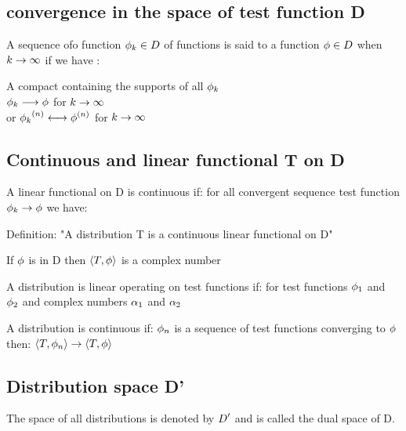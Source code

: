 \documentclass[11pt, openright]{book}
\begin{document}




\newpage

\subsection{convergence in the space of test function D}
A sequence ofo function $\displaystyle{\phi_{k}\in D}$ of functions is said to a function $\displaystyle{\phi \in D}$ when $\displaystyle{k \to \infty}$ if we have :
\begin{dent}{}
    A compact containing the supports of all $\displaystyle{\phi_k}$\\
    $\displaystyle{\phi_k \longrightarrow \phi}$ for $\displaystyle{k \to \infty}$\\
    or $\displaystyle{\phi_k}^{(n)} \longleftrightarrow \phi^{\left(n  \right) }$ for $\displaystyle{k \to \infty}$
\end{dent}

\subsection{Continuous and linear functional T on D}
A linear functional on D is continuous if: for all convergent sequence test function $\displaystyle{\phi_k \to \phi }$ we have:

Definition: "A distribution T is a continuous linear functional on D"
\begin{enum}{-15pt}{-15pt}
    \item If $\displaystyle{\phi}$ is in D then $\displaystyle{\left< T,\phi \right> }$  is a complex number
    \item A distribution is linear operating on test functions  if:
    for test functions $\displaystyle{\phi_1}$  and $\displaystyle{\phi_2}$ and complex numbers $\displaystyle{\alpha_1}$ and $\displaystyle{\alpha_2}$
    \item A distribution is continuous if: $\displaystyle{\phi_n}$ is a sequence of test functions converging to $\displaystyle{\phi}$ then: $\displaystyle{\left< T,\phi_n \right> \to \left< T,\phi \right>  }$
\end{enum}

\subsection{Distribution space D'}
The space of all distributions is denoted by $\displaystyle{D'}$ and is called the dual space of D.
\end{document}
